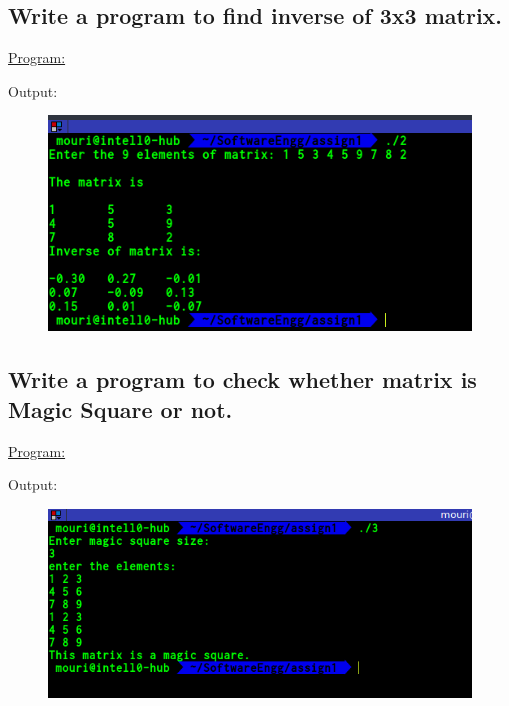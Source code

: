 \documentclass[a4paper,11pt]{article}
\begin{document}
\bigskip

\subsection{Write a program to find inverse of 3x3 matrix.}
\underline{Program:}

Output:
\begin{figure}[H]
\centering
\includegraphics[width=350pt,height=\textheight,keepaspectratio]{./pics/2.png}
\end{figure}

\bigskip

\subsection{Write a program to check whether matrix is Magic Square or not.}
\underline{Program:}

Output:
\begin{figure}[H]
\centering
\includegraphics[width=350pt,height=\textheight,keepaspectratio]{./pics/3.png}
\end{figure}
\bigskip
\end{document}
